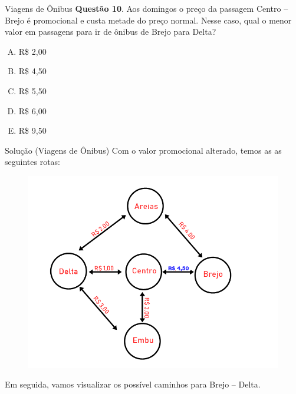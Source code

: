 \documentclass{beamer}
\begin{document}
\begin{frame}{Viagens de Ônibus}
\textbf{Questão 10}. Aos domingos o preço da passagem
Centro – Brejo é promocional e custa metade do
preço normal. Nesse caso, qual o menor valor em
passagens para ir de ônibus de Brejo para Delta?

\begin{enumerate}[(A)]
    \item R\$ 2,00
    \item R\$ 4,50
    \item R\$ 5,50
    \item R\$ 6,00
    \item R\$ 9,50
\end{enumerate}
\end{frame}


\begin{frame}{Solução (Viagens de Ônibus)}
Com o valor promocional alterado, temos as as seguintes rotas:

\begin{figure}[ht]
\centering
\includegraphics[width=.7\textwidth]{onibuspromocional.png}
\label{fig:exampleFig2}
\end{figure}

Em seguida, vamos visualizar os possível caminhos para Brejo – Delta. 

\end{frame}
\end{document}
